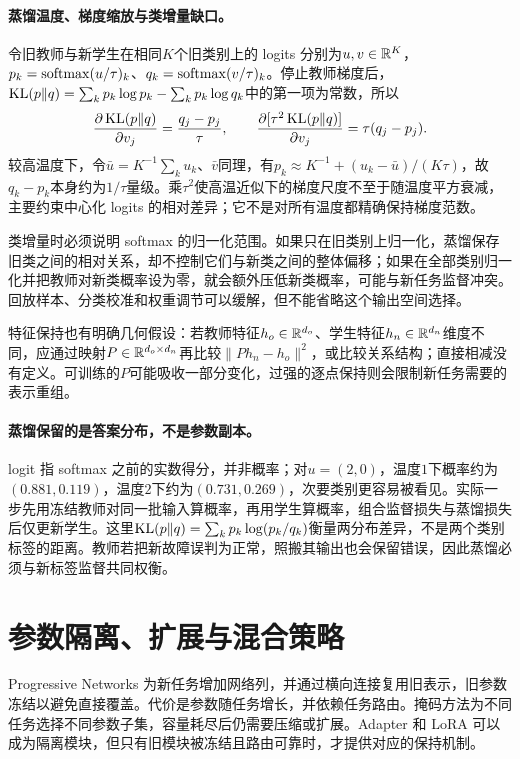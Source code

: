 \paragraph{蒸馏温度、梯度缩放与类增量缺口。}
令旧教师与新学生在相同$K$个旧类别上的 logits 分别为$u,v\in\mathbb{R}^K$，$p_k=\operatorname{softmax}(u/\tau)_k$、$q_k=\operatorname{softmax}(v/\tau)_k$。停止教师梯度后，$\operatorname{KL}(p\|q)=\sum_kp_k\log p_k-\sum_kp_k\log q_k$中的第一项为常数，所以
\begin{equation}
 \frac{\partial\operatorname{KL}(p\|q)}{\partial v_j}=\frac{q_j-p_j}{\tau},\qquad
 \frac{\partial[\tau^2\operatorname{KL}(p\|q)]}{\partial v_j}=\tau(q_j-p_j).
\end{equation}
较高温度下，令$\bar u=K^{-1}\sum_ku_k$、$\bar v$同理，有$p_k\approx K^{-1}+(u_k-\bar u)/(K\tau)$，故$q_k-p_k$本身约为$1/\tau$量级。乘$\tau^2$使高温近似下的梯度尺度不至于随温度平方衰减，主要约束中心化 logits 的相对差异；它不是对所有温度都精确保持梯度范数。

类增量时必须说明 softmax 的归一化范围。如果只在旧类别上归一化，蒸馏保存旧类之间的相对关系，却不控制它们与新类之间的整体偏移；如果在全部类别归一化并把教师对新类概率设为零，就会额外压低新类概率，可能与新任务监督冲突。回放样本、分类校准和权重调节可以缓解，但不能省略这个输出空间选择。

特征保持也有明确几何假设：若教师特征$h_o\in\mathbb{R}^{d_o}$、学生特征$h_n\in\mathbb{R}^{d_n}$维度不同，应通过映射$P\in\mathbb{R}^{d_o\times d_n}$再比较$\|Ph_n-h_o\|^2$，或比较关系结构；直接相减没有定义。可训练的$P$可能吸收一部分变化，过强的逐点保持则会限制新任务需要的表示重组。

\paragraph{蒸馏保留的是答案分布，不是参数副本。}
logit 指 softmax 之前的实数得分，并非概率；对$u=(2,0)$，温度$1$下概率约为$(0.881,0.119)$，温度$2$下约为$(0.731,0.269)$，次要类别更容易被看见。实际一步先用冻结教师对同一批输入算概率，再用学生算概率，组合监督损失与蒸馏损失后仅更新学生。这里$\operatorname{KL}(p\|q)=\sum_kp_k\log(p_k/q_k)$衡量两分布差异，不是两个类别标签的距离。教师若把新故障误判为正常，照搬其输出也会保留错误，因此蒸馏必须与新标签监督共同权衡。

\section{参数隔离、扩展与混合策略}
Progressive Networks 为新任务增加网络列，并通过横向连接复用旧表示，旧参数冻结以避免直接覆盖\cite{rusu2016progressive}。代价是参数随任务增长，并依赖任务路由。掩码方法为不同任务选择不同参数子集，容量耗尽后仍需要压缩或扩展。Adapter 和 LoRA 可以成为隔离模块，但只有旧模块被冻结且路由可靠时，才提供对应的保持机制。

